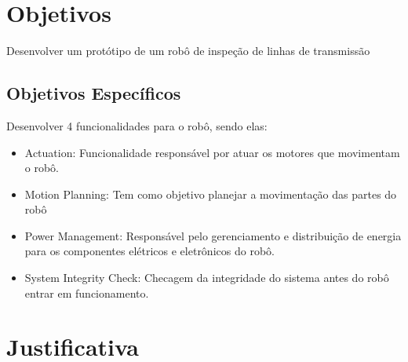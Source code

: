 \section{Objetivos}
\label{sec:obj}

Desenvolver um protótipo de um robô de inspeção de linhas de transmissão

\subsection{Objetivos Específicos}
\label{ssec:objesp}

Desenvolver 4 funcionalidades para o robô, sendo elas:

\begin{itemize}
	\item Actuation: Funcionalidade responsável por atuar os motores que movimentam o robô.
	\item Motion Planning: Tem como objetivo planejar a movimentação das partes do robô
	\item Power Management: Responsável pelo gerenciamento e distribuição de energia para os componentes elétricos e eletrônicos do robô.
	\item System Integrity Check: Checagem da integridade do sistema antes do robô entrar em funcionamento.
\end{itemize}

\section{Justificativa}
\label{sec:justi}

